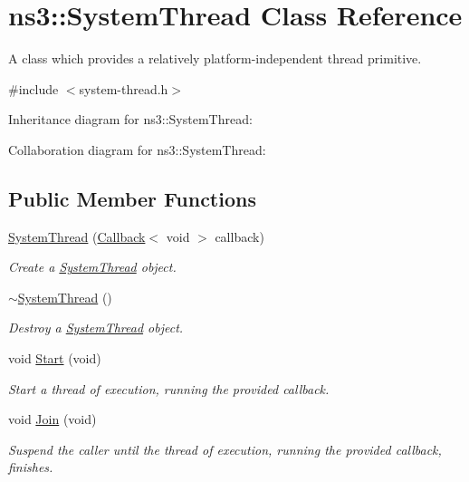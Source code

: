 \hypertarget{classns3_1_1SystemThread}{}\section{ns3\+:\+:System\+Thread Class Reference}
\label{classns3_1_1SystemThread}


A class which provides a relatively platform-\/independent thread primitive.  




{\ttfamily \#include $<$system-\/thread.\+h$>$}



Inheritance diagram for ns3\+:\+:System\+Thread\+:


Collaboration diagram for ns3\+:\+:System\+Thread\+:
\subsection*{Public Member Functions}
\begin{DoxyCompactItemize}
\item 
\hyperlink{classns3_1_1SystemThread_a710d3d98beeda0d66af56a6a8d90a281}{System\+Thread} (\hyperlink{classns3_1_1Callback}{Callback}$<$ void $>$ callback)
\begin{DoxyCompactList}\small\item\em Create a \hyperlink{classns3_1_1SystemThread}{System\+Thread} object. \end{DoxyCompactList}\item 
\hyperlink{classns3_1_1SystemThread_a9d905c76b478a702684ee2b18360fe61}{$\sim$\+System\+Thread} ()
\begin{DoxyCompactList}\small\item\em Destroy a \hyperlink{classns3_1_1SystemThread}{System\+Thread} object. \end{DoxyCompactList}\item 
void \hyperlink{classns3_1_1SystemThread_a95716a1cd24ee8e7c6a08b7a2ad9481e}{Start} (void)
\begin{DoxyCompactList}\small\item\em Start a thread of execution, running the provided callback. \end{DoxyCompactList}\item 
void \hyperlink{classns3_1_1SystemThread_a1cd5114bf675acf91565a6b85c95545f}{Join} (void)
\begin{DoxyCompactList}\small\item\em Suspend the caller until the thread of execution, running the provided callback, finishes. \end{DoxyCompactList}\end{DoxyCompactItemize}
